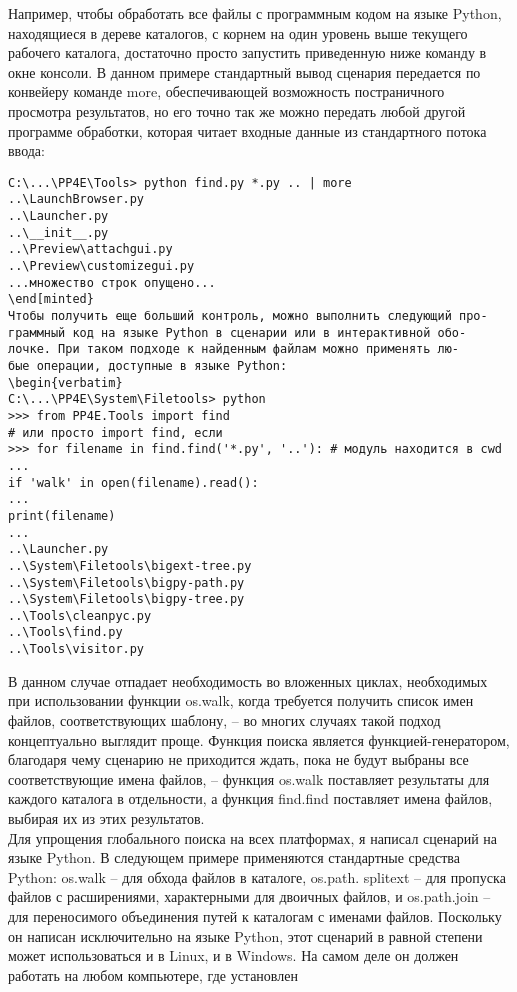 \documentclass[12pt]{article}
\begin{document}
Например, чтобы обработать все файлы с программным кодом на языке Python, находящиеся в дереве каталогов, с корнем на один уровень
выше текущего рабочего каталога, достаточно просто запустить приведенную ниже команду в окне консоли. В данном примере стандартный вывод
сценария передается по конвейеру команде more, обеспечивающей возможность постраничного просмотра результатов, но его точно так же можно передать любой другой программе обработки, которая читает
входные данные из стандартного потока ввода:
\begin{verbatim}
C:\...\PP4E\Tools> python find.py *.py .. | more
..\LaunchBrowser.py
..\Launcher.py
..\__init__.py
..\Preview\attachgui.py
..\Preview\customizegui.py
...множество строк опущено...
\end[minted}
Чтобы получить еще больший контроль, можно выполнить следующий про-
граммный код на языке Python в сценарии или в интерактивной обо-
лочке. При таком подходе к найденным файлам можно применять лю-
бые операции, доступные в языке Python:
\begin{verbatim}
C:\...\PP4E\System\Filetools> python
>>> from PP4E.Tools import find
# или просто import find, если
>>> for filename in find.find('*.py', '..'): # модуль находится в cwd
...
if 'walk' in open(filename).read():
...
print(filename)
...
..\Launcher.py
..\System\Filetools\bigext-tree.py
..\System\Filetools\bigpy-path.py
..\System\Filetools\bigpy-tree.py
..\Tools\cleanpyc.py
..\Tools\find.py
..\Tools\visitor.py
\end{verbatim}
В данном случае отпадает необходимость во вложенных циклах, необходимых при использовании функции os.walk, когда требуется получить список имен файлов, соответствующих шаблону, – во многих случаях такой подход концептуально выглядит проще. Функция поиска является функцией-генератором,
благодаря чему сценарию не приходится ждать, пока не будут выбраны
все соответствующие имена файлов, – функция os.walk поставляет результаты для каждого каталога в отдельности, а функция find.find поставляет имена файлов, выбирая их из этих результатов.\\
Для
упрощения глобального поиска на всех платформах, я написал сценарий на языке Python. В следующем примере применяются стандартные средства Python: os.walk – для обхода файлов в каталоге, os.path.
splitext – для пропуска файлов с расширениями, характерными для
двоичных файлов, и os.path.join – для переносимого объединения путей
к каталогам с именами файлов.
Поскольку он написан исключительно на языке Python, этот сценарий в равной степени может использоваться и в Linux, и в Windows. На
самом деле он должен работать на любом компьютере, где установлен
\end{document}
